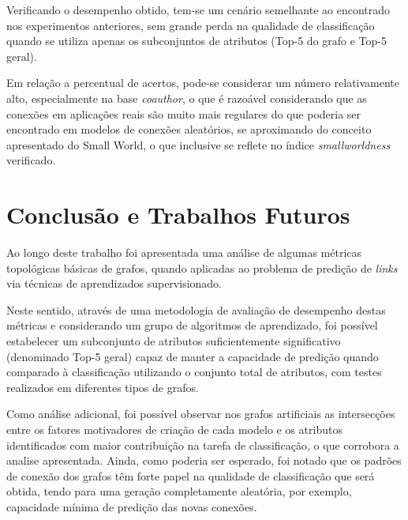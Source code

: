 \documentclass[a4paper,11pt]{article}
\begin{document}
Verificando o desempenho obtido, tem-se um cenário semelhante ao encontrado nos experimentos anteriores, sem grande perda na qualidade de classificação quando se utiliza apenas os subconjuntos de atributos (Top-5 do grafo e Top-5 geral).%
\newpage

Em relação a percentual de acertos, pode-se considerar um número relativamente alto, especialmente na base \textit{coauthor}, o que é razoável considerando que as conexões em aplicações reais são muito mais regulares do que poderia ser encontrado em modelos de conexões aleatórios, se aproximando do conceito apresentado do Small World, o que inclusive se reflete no índice \textit{smallworldness} verificado.%



\vspace{0.5cm}

\section{Conclusão e Trabalhos Futuros}

\vspace{0.5cm}

Ao longo deste trabalho foi apresentada uma análise de algumas métricas topológicas básicas de grafos, quando aplicadas ao problema de predição de \textit{links} via técnicas de aprendizados supervisionado.

Neste sentido, através de uma metodologia de avaliação de desempenho destas métricas e considerando um grupo de algoritmos de aprendizado, foi possível estabelecer um subconjunto de atributos suficientemente significativo (denominado Top-5 geral) capaz de manter a capacidade de predição quando comparado à classificação utilizando o conjunto total de atributos, com testes realizados em diferentes tipos de grafos.


Como análise adicional, foi possível observar nos grafos artificiais as intersecções entre os fatores motivadores de criação de cada modelo e os atributos identificados com maior contribuição na tarefa de classificação, o que corrobora a analise apresentada. 
%
Ainda, como poderia ser esperado, foi notado que os padrões de conexão dos grafos têm forte papel na qualidade de classificação que será obtida, tendo para uma geração completamente aleatória, por exemplo, capacidade mínima de predição das novas conexões.
\end{document}
